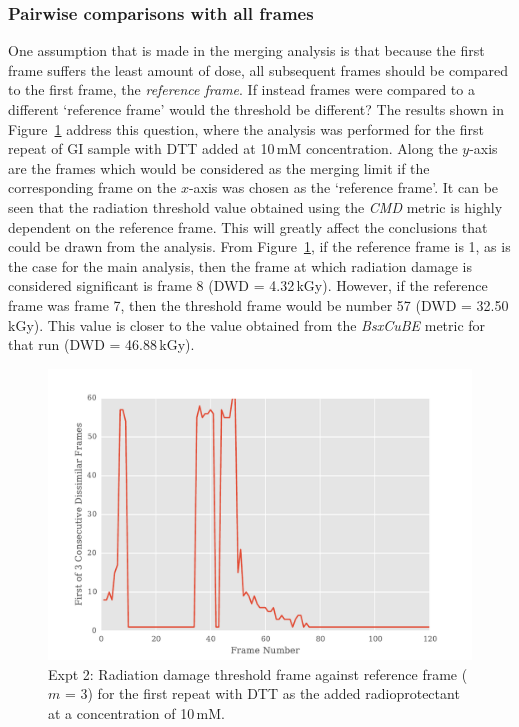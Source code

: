 \subsubsection{Pairwise comparisons with all frames}
\label{subs:Pairwise comparisons with all frames}
One assumption that is made in the merging analysis is that because the first frame suffers the least amount of dose, all subsequent frames should be compared to the first frame, the \textit{reference frame}.
If instead frames were compared to a different `reference frame' would the threshold be different?
The results shown in Figure~\ref{fig:First n diff frames - DTT} address this question, where the analysis was performed for the first repeat of GI sample with DTT added at 10$\,$mM concentration.
Along the $y$-axis are the frames which would be considered as the merging limit if the corresponding frame on the $x$-axis was chosen as the `reference frame'.
It can be seen that the radiation threshold value obtained using the \textit{CMD} metric is highly dependent on the reference frame.
This will greatly affect the conclusions that could be drawn from the analysis.
From Figure~\ref{fig:First n diff frames - DTT}, if the reference frame is 1, as is the case for the main analysis, then the frame at which radiation damage is considered significant is frame 8 (DWD = 4.32$\,$kGy).
However, if the reference frame was frame 7, then the threshold frame would be number 57 (DWD = 32.50\,kGy).
This value is closer to the value obtained from the \textit{BsxCuBE} metric for that run (DWD = 46.88\,kGy).
\begin{figure}
    \centering
    \includegraphics[width=1.0\textwidth]{figures/saxs/dtt_first_n_plot.pdf}
    \caption[Radiation damage threshold frame against reference frame ($m$ = 3) for the first repeat with DTT as the added radioprotectant at a concentration of 10\,mM.]{Expt 2: Radiation damage threshold frame against reference frame ($m$ = 3) for the first repeat with DTT as the added radioprotectant at a concentration of 10\,mM.}
    \label{fig:First n diff frames - DTT}
\end{figure}

